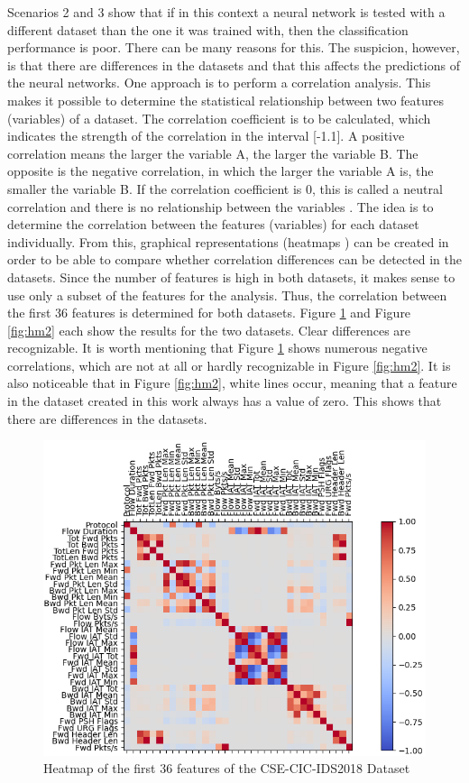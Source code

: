 \documentclass[conference]{IEEEtran}
\begin{document}
Scenarios 2 and 3 show that if in this context a neural network is tested with a different dataset than the one it was trained with, then the classification performance is poor. There can be many reasons for this. The suspicion, however, is that there are differences in the datasets and that this affects the predictions of the neural networks. One approach is to perform a correlation analysis. This makes it possible to determine the statistical relationship between two features (variables) of a dataset. The correlation coefficient is to be calculated, which indicates the strength of the correlation in the interval [-1.1]. A positive correlation means the larger the variable A, the larger the variable B. The opposite is the negative correlation, in which the larger the variable A is, the smaller the variable B. If the correlation coefficient is 0, this is called a neutral correlation and there is no relationship between the variables \cite{max4}. The idea is to determine the correlation between the features (variables) for each dataset individually. From this, graphical representations (heatmaps \cite{max5}) can be created in order to be able to compare whether correlation differences can be detected in the datasets. Since the number of features is high in both datasets, it makes sense to use only a subset of the features for the analysis. Thus, the correlation between the first 36 features is determined for both datasets. Figure \ref{fig:hm1} and Figure \ref{fig:hm2} each show the results for the two datasets. Clear differences are recognizable. It is worth mentioning that Figure \ref{fig:hm1} shows numerous negative correlations, which are not at all or hardly recognizable in Figure \ref{fig:hm2}. It is also noticeable that in Figure \ref{fig:hm2}, white lines occur, meaning that a feature in the dataset created in this work always has a value of zero. This shows that there are differences in the datasets. 

\begin{figure}[htbp]  
\centerline{\includegraphics[scale=0.8]{Heatmap-AlteDaten-Filtered-0-35.png}}
\caption{Heatmap of the first 36 features of the CSE-CIC-IDS2018 Dataset}
\label{fig:hm1}
\end{figure}
\end{document}
